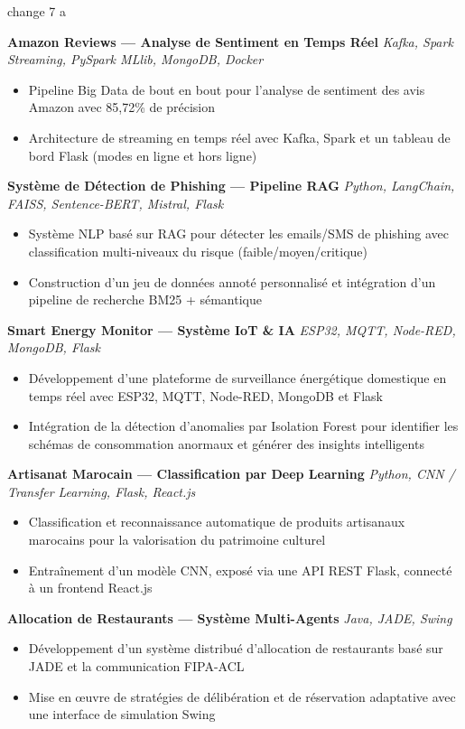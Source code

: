 change 7 a \documentclass[11pt,a4paper]{article}
\begin{document}
\textbf{Amazon Reviews --- Analyse de Sentiment en Temps R\'eel} \hfill \textit{Kafka, Spark Streaming, PySpark MLlib, MongoDB, Docker}
\begin{itemize}
    \item Pipeline Big Data de bout en bout pour l'analyse de sentiment des avis Amazon avec 85,72\% de pr\'ecision
    \item Architecture de streaming en temps r\'eel avec Kafka, Spark et un tableau de bord Flask (modes en ligne et hors ligne)
\end{itemize}

\textbf{Syst\`eme de D\'etection de Phishing --- Pipeline RAG} \hfill \textit{Python, LangChain, FAISS, Sentence-BERT, Mistral, Flask}
\begin{itemize}
    \item Syst\`eme NLP bas\'e sur RAG pour d\'etecter les emails/SMS de phishing avec classification multi-niveaux du risque (faible/moyen/critique)
    \item Construction d'un jeu de donn\'ees annot\'e personnalis\'e et int\'egration d'un pipeline de recherche BM25 + s\'emantique
\end{itemize}

\textbf{Smart Energy Monitor --- Syst\`eme IoT \& IA} \hfill \textit{ESP32, MQTT, Node-RED, MongoDB, Flask}
\begin{itemize}
    \item D\'eveloppement d'une plateforme de surveillance \'energ\'etique domestique en temps r\'eel avec ESP32, MQTT, Node-RED, MongoDB et Flask
    \item Int\'egration de la d\'etection d'anomalies par Isolation Forest pour identifier les sch\'emas de consommation anormaux et g\'en\'erer des insights intelligents
\end{itemize}

\textbf{Artisanat Marocain --- Classification par Deep Learning} \hfill \textit{Python, CNN / Transfer Learning, Flask, React.js}
\begin{itemize}
    \item Classification et reconnaissance automatique de produits artisanaux marocains pour la valorisation du patrimoine culturel
    \item Entra\^inement d'un mod\`ele CNN, expos\'e via une API REST Flask, connect\'e \`a un frontend React.js
\end{itemize}

\textbf{Allocation de Restaurants --- Syst\`eme Multi-Agents} \hfill \textit{Java, JADE, Swing}
\begin{itemize}
    \item D\'eveloppement d'un syst\`eme distribu\'e d'allocation de restaurants bas\'e sur JADE et la communication FIPA-ACL
    \item Mise en \oe uvre de strat\'egies de d\'elib\'eration et de r\'eservation adaptative avec une interface de simulation Swing
\end{itemize}
\end{document}
